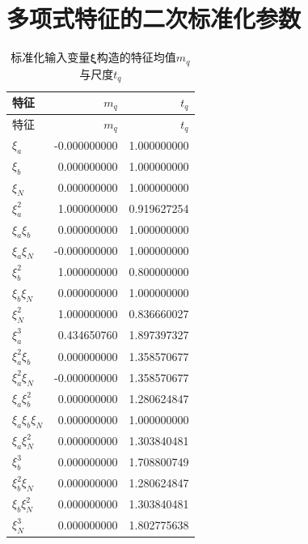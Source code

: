 \documentclass[UTF8,12pt,a4paper]{ctexart}
\begin{document}
\section{多项式特征的二次标准化参数}
\begin{longtable}{lrr}
\caption{标准化输入变量$\bm\xi$构造的特征均值$m_q$与尺度$t_q$}\label{tab:featurescale}\\
\toprule
特征 & $m_q$ & $t_q$ \\
\midrule
\endfirsthead
\toprule
特征 & $m_q$ & $t_q$ \\
\midrule
\endhead
$\xi_a$ & -0.000000000 & 1.000000000 \\
$\xi_b$ & 0.000000000 & 1.000000000 \\
$\xi_N$ & 0.000000000 & 1.000000000 \\
$\xi_a^{2}$ & 1.000000000 & 0.919627254 \\
$\xi_a\xi_b$ & 0.000000000 & 1.000000000 \\
$\xi_a\xi_N$ & -0.000000000 & 1.000000000 \\
$\xi_b^{2}$ & 1.000000000 & 0.800000000 \\
$\xi_b\xi_N$ & 0.000000000 & 1.000000000 \\
$\xi_N^{2}$ & 1.000000000 & 0.836660027 \\
$\xi_a^{3}$ & 0.434650760 & 1.897397327 \\
$\xi_a^{2}\xi_b$ & 0.000000000 & 1.358570677 \\
$\xi_a^{2}\xi_N$ & -0.000000000 & 1.358570677 \\
$\xi_a\xi_b^{2}$ & 0.000000000 & 1.280624847 \\
$\xi_a\xi_b\xi_N$ & 0.000000000 & 1.000000000 \\
$\xi_a\xi_N^{2}$ & 0.000000000 & 1.303840481 \\
$\xi_b^{3}$ & 0.000000000 & 1.708800749 \\
$\xi_b^{2}\xi_N$ & 0.000000000 & 1.280624847 \\
$\xi_b\xi_N^{2}$ & 0.000000000 & 1.303840481 \\
$\xi_N^{3}$ & 0.000000000 & 1.802775638 \\
\bottomrule
\end{longtable}
\end{document}
